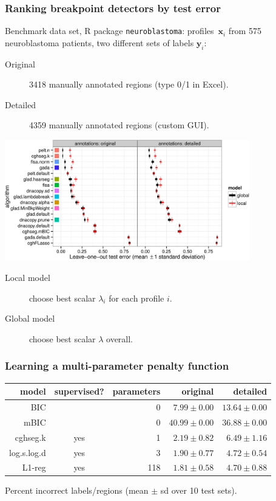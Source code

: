 \documentclass{beamer}
\begin{document}
\begin{frame}
  \frametitle{Ranking breakpoint detectors by test error}

  Benchmark data set, R package \texttt{neuroblastoma}:
  profiles~$\mathbf x_i$ from 575 neuroblastoma patients, two
  different sets of labels $\mathbf y_i$:
  \begin{description}
  \item[Original] 3418 manually annotated regions (type 0/1 in Excel).
  \item[Detailed] 4359 manually annotated regions (custom GUI).
  \end{description}

  \begin{center}
    \includegraphics[width=0.8\textwidth]{bams-test-error}
  \end{center}

  \begin{description}
  \item[Local model] choose best scalar $\lambda_i$ for each profile $i$.\\
  \item[Global model] choose best scalar $\lambda$ overall.
  \end{description}
\end{frame}

\begin{frame}
  \frametitle{Learning a multi-parameter penalty function}
  \begin{center}
    

    \small

    \begin{tabular}{rcrrr}
      \hline
      model & supervised? & parameters & original & detailed \\ 
      \hline
      BIC &  & 0 & $7.99 \pm 0.00$ & $13.64 \pm 0.00$ \\ 
      mBIC & & 0 & $40.99 \pm 0.00$ & $36.88 \pm 0.00$ \\ 
      cghseg.k & yes &1 & $2.19 \pm 0.82$ & $6.49 \pm 1.16$ \\ 
      log.s.log.d & yes &3 & $1.90 \pm 0.77$ & $4.72 \pm 0.54$ \\ 
      L1-reg & yes & 118 &$1.81 \pm 0.58$ & $4.70 \pm 0.88$ \\ 
      \hline
    \end{tabular}

    Percent incorrect labels/regions (mean $\pm$ sd over 10 test sets).

  \end{center}
\end{frame}
\end{document}
